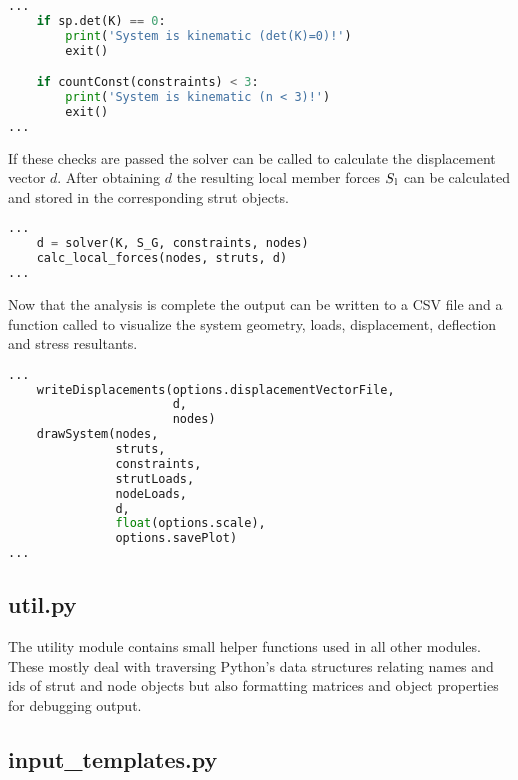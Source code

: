 \begin{inconsolata}
\begin{lstlisting}[language=python]
...
    if sp.det(K) == 0:
        print('System is kinematic (det(K)=0)!')
        exit()

    if countConst(constraints) < 3:
        print('System is kinematic (n < 3)!')
        exit()
...
\end{lstlisting}
\end{inconsolata}

If these checks are passed the solver can be called to calculate the displacement vector $d$.
After obtaining $d$ the resulting local member forces $S\textsubscript{l}$ can be calculated and stored in the corresponding strut objects.

\begin{inconsolata}
\begin{lstlisting}[language=python]
...
    d = solver(K, S_G, constraints, nodes)
    calc_local_forces(nodes, struts, d)
...
\end{lstlisting}
\end{inconsolata}

Now that the analysis is complete the output can be written to a CSV file and a function called to visualize the system geometry, loads, displacement, deflection and stress resultants.

\begin{inconsolata}
\begin{lstlisting}[language=python]
...
    writeDisplacements(options.displacementVectorFile,
                       d,
                       nodes)
    drawSystem(nodes,
               struts,
               constraints,
               strutLoads,
               nodeLoads,
               d,
               float(options.scale),
               options.savePlot)
...
\end{lstlisting}
\end{inconsolata}


\subsection{util.py}
\label{subsec:util.py}

The utility module contains small helper functions used in all other modules.
These mostly deal with traversing Python's data structures relating names and ids of strut and node objects but also formatting matrices and object properties for debugging output.

\subsection{input\_templates.py}
\label{subsec:inputtemplates.py}

